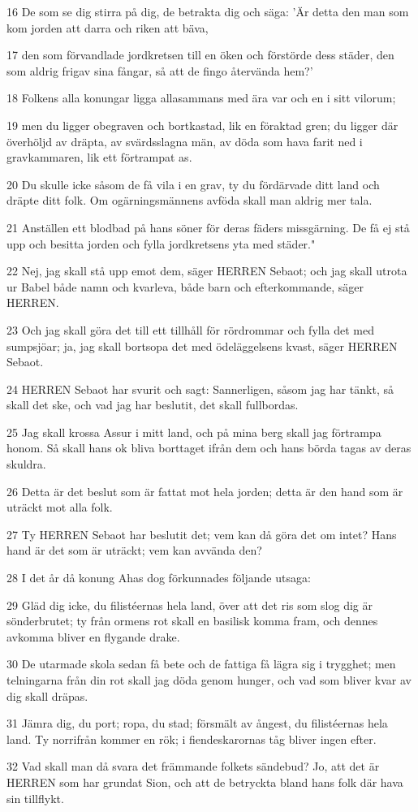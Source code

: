\par 16 De som se dig stirra på dig, de betrakta dig och säga: 'Är detta den man som kom jorden att darra och riken att bäva,
\par 17 den som förvandlade jordkretsen till en öken och förstörde dess städer, den som aldrig frigav sina fångar, så att de fingo återvända hem?'
\par 18 Folkens alla konungar ligga allasammans med ära var och en i sitt vilorum;
\par 19 men du ligger obegraven och bortkastad, lik en föraktad gren; du ligger där överhöljd av dräpta, av svärdsslagna män, av döda som hava farit ned i gravkammaren, lik ett förtrampat as.
\par 20 Du skulle icke såsom de få vila i en grav, ty du fördärvade ditt land och dräpte ditt folk. Om ogärningsmännens avföda skall man aldrig mer tala.
\par 21 Anställen ett blodbad på hans söner för deras fäders missgärning. De få ej stå upp och besitta jorden och fylla jordkretsens yta med städer."
\par 22 Nej, jag skall stå upp emot dem, säger HERREN Sebaot; och jag skall utrota ur Babel både namn och kvarleva, både barn och efterkommande, säger HERREN.
\par 23 Och jag skall göra det till ett tillhåll för rördrommar och fylla det med sumpsjöar; ja, jag skall bortsopa det med ödeläggelsens kvast, säger HERREN Sebaot.
\par 24 HERREN Sebaot har svurit och sagt: Sannerligen, såsom jag har tänkt, så skall det ske, och vad jag har beslutit, det skall fullbordas.
\par 25 Jag skall krossa Assur i mitt land, och på mina berg skall jag förtrampa honom. Så skall hans ok bliva borttaget ifrån dem och hans börda tagas av deras skuldra.
\par 26 Detta är det beslut som är fattat mot hela jorden; detta är den hand som är uträckt mot alla folk.
\par 27 Ty HERREN Sebaot har beslutit det; vem kan då göra det om intet? Hans hand är det som är uträckt; vem kan avvända den?
\par 28 I det år då konung Ahas dog förkunnades följande utsaga:
\par 29 Gläd dig icke, du filistéernas hela land, över att det ris som slog dig är sönderbrutet; ty från ormens rot skall en basilisk komma fram, och dennes avkomma bliver en flygande drake.
\par 30 De utarmade skola sedan få bete och de fattiga få lägra sig i trygghet; men telningarna från din rot skall jag döda genom hunger, och vad som bliver kvar av dig skall dräpas.
\par 31 Jämra dig, du port; ropa, du stad; försmält av ångest, du filistéernas hela land. Ty norrifrån kommer en rök; i fiendeskarornas tåg bliver ingen efter.
\par 32 Vad skall man då svara det främmande folkets sändebud? Jo, att det är HERREN som har grundat Sion, och att de betryckta bland hans folk där hava sin tillflykt.

